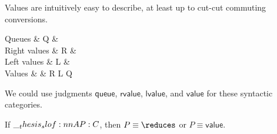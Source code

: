 Values are intuitively easy to describe, at least up to cut-cut commuting conversions.
\begin{syntax*}
  Q{}ueues & Q & \selectL{\kay} \mid \selectR{\kay} \mid {} \mid {} \\
  Right values & R &  \mid {} \\
   Left values & L &  \mid {} \\
        Values & \enspace\; & R \mid L \mid Q \mid \fwd
\end{syntax*}
We could use judgments $\mathsf{queue}$, $\mathsf{rvalue}$, $\mathsf{lvalue}$, and $\mathsf{value}$ for these syntactic categories.

\begin{theorem}
  If $\slof{A |- P : C}$, then $P \equiv\reduces$ or $P \equiv\mathrel{\mathsf{value}}$.
\end{theorem}
